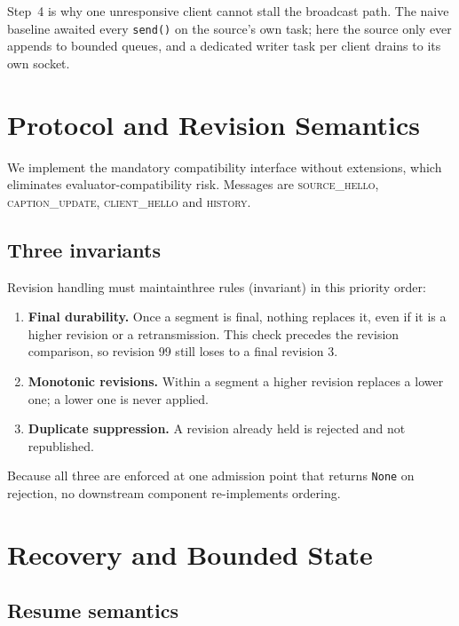 \documentclass[11pt,a4paper]{article}
\begin{document}
Step~4 is why one unresponsive client cannot stall the broadcast path.
The naive baseline awaited every \texttt{send()} on the source's own
task; here the source only ever appends to bounded queues, and a
dedicated writer task per client drains to its own socket.

\section{Protocol and Revision Semantics}

We implement the mandatory compatibility interface without extensions,
which eliminates evaluator-compatibility risk. Messages are
\textsc{source\_hello}, \textsc{caption\_update},
\textsc{client\_hello} and \textsc{history}.

\subsection{Three invariants}

Revision handling must maintainthree rules (invariant) in this priority
order:

\begin{enumerate}
\item \textbf{Final durability.} Once a segment is final, nothing
      replaces it, even if it is a higher revision or a retransmission. This
      check precedes the revision comparison, so revision 99 still
      loses to a final revision 3.
\item \textbf{Monotonic revisions.} Within a segment a higher revision
      replaces a lower one; a lower one is never applied.
\item \textbf{Duplicate suppression.} A revision already held is
      rejected and not republished.
\end{enumerate}

Because all three are enforced at one admission point that returns
\texttt{None} on rejection, no downstream component re-implements
ordering.

\section{Recovery and Bounded State}

\subsection{Resume semantics}
\end{document}
